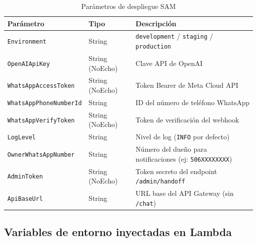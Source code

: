 \documentclass[12pt,a4paper]{article}
\begin{document}
\begin{table}[H]
\centering
\begin{tabular}{@{}lll@{}}
\toprule
\textbf{Parámetro} & \textbf{Tipo} & \textbf{Descripción} \\
\midrule
\texttt{Environment} & String & \texttt{development} / \texttt{staging} / \texttt{production} \\
\texttt{OpenAIApiKey} & String (NoEcho) & Clave API de OpenAI \\
\texttt{WhatsAppAccessToken} & String (NoEcho) & Token Bearer de Meta Cloud API \\
\texttt{WhatsAppPhoneNumberId} & String & ID del número de teléfono WhatsApp \\
\texttt{WhatsAppVerifyToken} & String (NoEcho) & Token de verificación del webhook \\
\texttt{LogLevel} & String & Nivel de log (\texttt{INFO} por defecto) \\
\texttt{OwnerWhatsAppNumber} & String & Número del dueño para notificaciones (ej: \texttt{506XXXXXXXX}) \\
\texttt{AdminToken} & String (NoEcho) & Token secreto del endpoint \texttt{/admin/handoff} \\
\texttt{ApiBaseUrl} & String & URL base del API Gateway (sin \texttt{/chat}) \\
\bottomrule
\end{tabular}
\caption{Parámetros de despliegue SAM}
\end{table}

\subsection{Variables de entorno inyectadas en Lambda}
\end{document}

